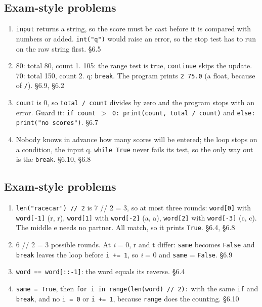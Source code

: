 \documentclass[11pt]{article}
\begin{document}
\begin{keepsection}\subsection{Exam-style problems}

\begin{enumerate}
\item \texttt{input} returns a string, so the score must be cast before it is compared with numbers or added. \texttt{int("q")} would raise an error, so the stop test has to run on the raw string first. \hfill{\small\color{FAUblue}§6.5}
\item 80: total 80, count 1. 105: the range test is true, \texttt{continue} skips the update. 70: total 150, count 2. q: \texttt{break}. The program prints \texttt{2 75.0} (a float, because of \texttt{/}). \hfill{\small\color{FAUblue}§6.9, §6.2}
\item \texttt{count} is 0, so \texttt{total / count} divides by zero and the program stops with an error. Guard it: \texttt{if count \ensuremath{>} 0: print(count, total / count)} and \texttt{else: print("no scores")}. \hfill{\small\color{FAUblue}§6.7}
\item Nobody knows in advance how many scores will be entered; the loop stops on a condition, the input q. \texttt{while True} never fails its test, so the only way out is the \texttt{break}. \hfill{\small\color{FAUblue}§6.10, §6.8}
\end{enumerate}

\end{keepsection}
\begin{keepsection}\subsection{Exam-style problems}

\begin{enumerate}
\item \texttt{len("racecar") // 2} is 7 // 2 = 3, so at most three rounds: \texttt{word[0]} with \texttt{word[-1]} (r, r), \texttt{word[1]} with \texttt{word[-2]} (a, a), \texttt{word[2]} with \texttt{word[-3]} (c, c). The middle e needs no partner. All match, so it prints \texttt{True}. \hfill{\small\color{FAUblue}§6.4, §6.8}
\item 6 // 2 = 3 possible rounds. At \textit{i} = 0, r and t differ: \texttt{same} becomes \texttt{False} and \texttt{break} leaves the loop before \texttt{i += 1}, so \textit{i} = 0 and \texttt{same} = \texttt{False}. \hfill{\small\color{FAUblue}§6.9}
\item \texttt{word == word[::-1]}: the word equals its reverse. \hfill{\small\color{FAUblue}§6.4}
\item \texttt{same = True}, then \texttt{for i in range(len(word) // 2):} with the same \texttt{if} and \texttt{break}, and no \texttt{i = 0} or \texttt{i += 1}, because \texttt{range} does the counting. \hfill{\small\color{FAUblue}§6.10}
\end{enumerate}

\end{keepsection}
\end{document}
